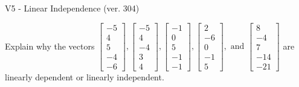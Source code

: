 \begin{exercise}
  \begin{exerciseTitle}V5 - Linear Independence (ver. 304)\end{exerciseTitle}
  \begin{exerciseStatement}
    Explain why the vectors \(\left[\begin{array}{r}
-5 \\
4 \\
5 \\
-4 \\
-6
\end{array}\right] , \left[\begin{array}{r}
-5 \\
4 \\
-4 \\
3 \\
4
\end{array}\right] , \left[\begin{array}{r}
-1 \\
0 \\
5 \\
-1 \\
-1
\end{array}\right] , \left[\begin{array}{r}
2 \\
-6 \\
0 \\
-1 \\
5
\end{array}\right] , \text{ and } \left[\begin{array}{r}
8 \\
-4 \\
7 \\
-14 \\
-21
\end{array}\right]\) are linearly dependent or linearly independent.	



\end{exerciseStatement}
\end{exercise}

